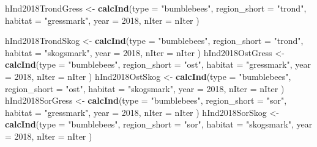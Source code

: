 \documentclass[]{article}
\newenvironment{Shaded}{\begin{snugshade}}{\end{snugshade}}
\newcommand{\KeywordTok}[1]{\textcolor[rgb]{0.13,0.29,0.53}{\textbf{#1}}}
\newcommand{\DataTypeTok}[1]{\textcolor[rgb]{0.13,0.29,0.53}{#1}}
\newcommand{\DecValTok}[1]{\textcolor[rgb]{0.00,0.00,0.81}{#1}}
\newcommand{\StringTok}[1]{\textcolor[rgb]{0.31,0.60,0.02}{#1}}
\newcommand{\NormalTok}[1]{#1}
\begin{document}
\begin{Shaded}
\begin{Highlighting}[]
\NormalTok{hInd2018TrondGress <-}\StringTok{ }\KeywordTok{calcInd}\NormalTok{(}\DataTypeTok{type =} \StringTok{"bumblebees"}\NormalTok{,}
                              \DataTypeTok{region_short =} \StringTok{"trond"}\NormalTok{,}
                              \DataTypeTok{habitat =} \StringTok{"gressmark"}\NormalTok{,}
                              \DataTypeTok{year =} \DecValTok{2018}\NormalTok{,}
                              \DataTypeTok{nIter =}\NormalTok{ nIter}
\NormalTok{                              )}
       
\NormalTok{hInd2018TrondSkog <-}\StringTok{ }\KeywordTok{calcInd}\NormalTok{(}\DataTypeTok{type =} \StringTok{"bumblebees"}\NormalTok{,}
                              \DataTypeTok{region_short =} \StringTok{"trond"}\NormalTok{,}
                              \DataTypeTok{habitat =} \StringTok{"skogsmark"}\NormalTok{,}
                              \DataTypeTok{year =} \DecValTok{2018}\NormalTok{,}
                              \DataTypeTok{nIter =}\NormalTok{ nIter}
\NormalTok{                              )}
\NormalTok{hInd2018OstGress <-}\StringTok{ }\KeywordTok{calcInd}\NormalTok{(}\DataTypeTok{type =} \StringTok{"bumblebees"}\NormalTok{,}
                              \DataTypeTok{region_short =} \StringTok{"ost"}\NormalTok{,}
                              \DataTypeTok{habitat =} \StringTok{"gressmark"}\NormalTok{,}
                              \DataTypeTok{year =} \DecValTok{2018}\NormalTok{,}
                              \DataTypeTok{nIter =}\NormalTok{ nIter}
\NormalTok{                              )}
\NormalTok{hInd2018OstSkog <-}\StringTok{ }\KeywordTok{calcInd}\NormalTok{(}\DataTypeTok{type =} \StringTok{"bumblebees"}\NormalTok{,}
                              \DataTypeTok{region_short =} \StringTok{"ost"}\NormalTok{,}
                              \DataTypeTok{habitat =} \StringTok{"skogsmark"}\NormalTok{,}
                              \DataTypeTok{year =} \DecValTok{2018}\NormalTok{,}
                              \DataTypeTok{nIter =}\NormalTok{ nIter}
\NormalTok{                              )}
\NormalTok{hInd2018SorGress <-}\StringTok{ }\KeywordTok{calcInd}\NormalTok{(}\DataTypeTok{type =} \StringTok{"bumblebees"}\NormalTok{,}
                              \DataTypeTok{region_short =} \StringTok{"sor"}\NormalTok{,}
                              \DataTypeTok{habitat =} \StringTok{"gressmark"}\NormalTok{,}
                              \DataTypeTok{year =} \DecValTok{2018}\NormalTok{,}
                              \DataTypeTok{nIter =}\NormalTok{ nIter}
\NormalTok{                              )}
\NormalTok{hInd2018SorSkog <-}\StringTok{ }\KeywordTok{calcInd}\NormalTok{(}\DataTypeTok{type =} \StringTok{"bumblebees"}\NormalTok{,}
                              \DataTypeTok{region_short =} \StringTok{"sor"}\NormalTok{,}
                              \DataTypeTok{habitat =} \StringTok{"skogsmark"}\NormalTok{,}
                              \DataTypeTok{year =} \DecValTok{2018}\NormalTok{,}
                              \DataTypeTok{nIter =}\NormalTok{ nIter}
\NormalTok{                              )}


\end{Highlighting}
\end{Shaded}
\end{document}
